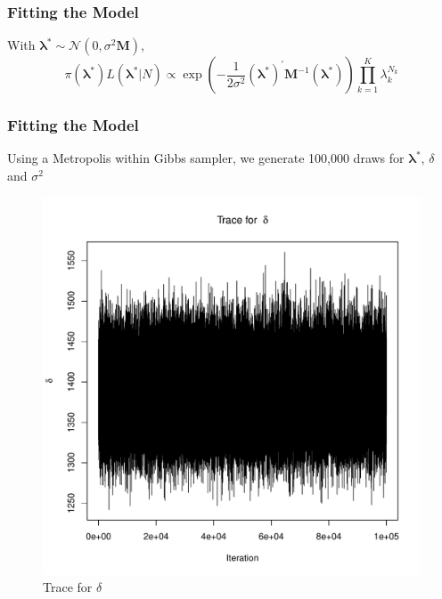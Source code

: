 \documentclass[10pt, compress]{beamer}
\begin{document}
  \begin{frame}
    \frametitle{Fitting the Model}
      With $\boldsymbol\lambda^{*} \sim \mathcal{N}(0, \sigma^2\mathbf{M})$, 
    $$ \pi(\boldsymbol\lambda^{*})L(\boldsymbol\lambda^{*} | N) \propto 
      \exp\left(-\frac{1}{2\sigma^2}(\boldsymbol\lambda^{*})^{'}\mathbf{M}^{-1}(\boldsymbol\lambda^{*})\right)\prod_{k=1}^{K}\lambda_k^{N_k} $$
  \end{frame}
  \begin{frame}
    \frametitle{Fitting the Model}
    Using a Metropolis within Gibbs sampler, we generate 100,000 draws for $\boldsymbol\lambda^{*}$, $\delta$ and $\sigma^2$
    \begin{figure}
      \begin{minipage}{0.3\textwidth}
        \includegraphics[width=1.0\textwidth]{delta_trace.pdf}
        \caption{Trace for $\delta$}
      \end{minipage}
      \hfill
      \begin{minipage}{0.3\textwidth}

\end{minipage}
\end{figure}
\end{frame}
\end{document}
